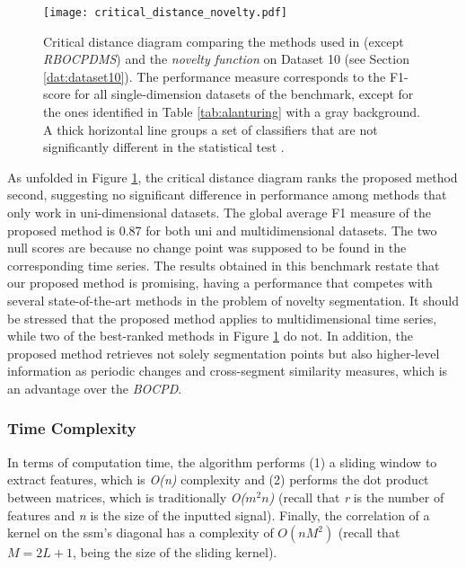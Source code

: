 \begin{figure}
    \centering
    \texttt{[image: critical\_distance\_novelty.pdf]}
    \caption{Critical distance diagram comparing the methods used in \cite{cpd_alan} (except \textit{RBOCPDMS}) and the \textit{novelty function} on Dataset 10 (see Section \ref{dat:dataset10}). The performance measure corresponds to the F1-score for all single-dimension datasets of the benchmark, except for the ones identified in Table \ref{tab:alanturing} with a gray background. A thick horizontal line groups a set of classifiers that are not significantly different in the statistical test \cite{critical_dif}.}
    \label{fig:cdd_alant}
\end{figure}

As unfolded in Figure \ref{fig:cdd_alant}, the critical distance diagram ranks the proposed method second, suggesting no significant difference in performance among methods that only work in uni-dimensional datasets. The global average F1 measure of the proposed method is 0.87 for both uni and multidimensional datasets. The two null scores are because no change point was supposed to be found in the corresponding time series. The results obtained in this benchmark restate that our proposed method is promising, having a performance that competes with several state-of-the-art methods in the problem of novelty segmentation. It should be stressed that the proposed method applies to multidimensional time series, while two of the best-ranked methods in Figure \ref{fig:cdd_alant} do not. In addition, the proposed method retrieves not solely segmentation points but also higher-level information as periodic changes and cross-segment similarity measures, which is an advantage over the \textit{BOCPD}.

\subsubsection{Time Complexity}
\label{sec:time_complexity}

In terms of computation time, the algorithm performs (1) a sliding window to extract features, which is \textit{O(n)} complexity and (2) performs the dot product between matrices, which is traditionally \textit{O($m^2n$)} (recall that \textit{r} is the number of features and \textit{n} is the size of the inputted signal). Finally, the correlation of a kernel on the \gls{ssm}'s diagonal has a complexity of $O(nM^2)$ (recall that $M=2L+1$, being the size of the sliding kernel).

